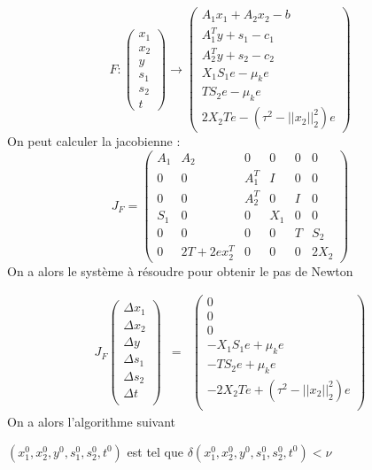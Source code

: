 $$
F : \begin{pmatrix}
x_1 \\ x_2 \\ y \\ s_1 \\ s_2 \\ t
\end{pmatrix}
\rightarrow
\begin{pmatrix}
A_1x_1+A_2x_2-b \\
A^T_1y + s_1 -c_1 \\
A_2^Ty + s_2 - c_2 \\
X_1S_1e - \mu_k e \\
TS_2e - \mu_ke \\
2X_2Te - (\tau^2-||x_2||_2^2)e
\end{pmatrix}
$$
On peut calculer la jacobienne : 
$$J_F = \begin{pmatrix}
A_1 & A_2 & 0 & 0 & 0 & 0 \\
0 & 0 & A_1^T & I & 0 & 0 \\
0 & 0 & A_2^T & 0 & I & 0 \\
S_1 & 0 & 0 & X_1 & 0 & 0 \\
0 & 0 & 0 & 0 & T & S_2 \\
0 & 2T + 2ex_2^T & 0 & 0 & 0 & 2X_2 

\end{pmatrix}$$
On a alors le système à résoudre pour obtenir le pas de Newton

\begin{align}
J_F \begin{pmatrix}
\Delta x_1 \\
\Delta x_2 \\
\Delta y \\
\Delta s_1\\
\Delta s_2\\
\Delta t\\
\end{pmatrix} & = & \begin{pmatrix}
0 \\
0\\
0\\
-X_1S_1e+\mu_k e \\
-TS_2e + \mu_k e\\
-2X_2Te+ (\tau^2-||x_2||_2^2)e\\
\end{pmatrix}
\label{eq:pasN}
\end{align}
On a alors l'algorithme suivant
\begin{algorithm}[!h]
$(x_1^{0},x_2^{0},y^{0},s_1^{0},s_2^{0},t^{0})$ est tel que 
$\delta(x_1^{0},x_2^{0},y^{0},s_1^{0},s_2^{0},t^{0}) < \nu$\;
\end{algorithm}